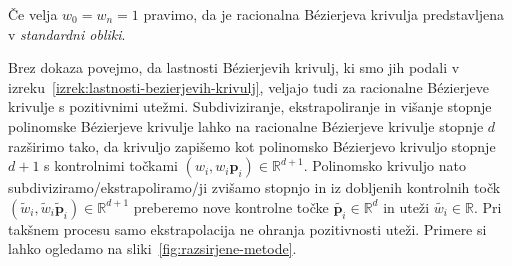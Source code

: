 \documentclass[isrm2, tisk]{fmfdelo}
\newcommand{\R}{\mathbb R}
\newcommand{\p}{\mathbf{p}}
\begin{document}
    \begin{opomba}
        Če velja $w_0=w_n=1$ pravimo, da je racionalna Bézierjeva krivulja predstavljena v \textit{standardni obliki}.
    \end{opomba}
    Brez dokaza povejmo, da lastnosti Bézierjevih krivulj, ki smo jih podali v izreku~\ref{izrek:lastnosti-bezierjevih-krivulj}, veljajo tudi za racionalne Bézierjeve krivulje s pozitivnimi utežmi.
    Subdiviziranje, ekstrapoliranje in višanje stopnje polinomske Bézierjeve krivulje lahko na racionalne Bézierjeve krivulje stopnje $d$ razširimo tako, da krivuljo zapišemo kot polinomsko Bézierjevo krivuljo stopnje $d+1$ s kontrolnimi točkami  $(w_i,w_{i}\p_i)\in \R^{d+1}$.
    Polinomsko krivuljo nato subdiviziramo/ekstrapoliramo/ji zvišamo stopnjo in iz dobljenih kontrolnih točk $(\tilde{w}_i,\tilde{w}_{i}\tilde{\p}_i)\in\R^{d+1}$ preberemo nove kontrolne točke $\tilde{\p_i}\in\R^d$ in uteži $\tilde{w_i}\in\R$.
    Pri takšnem procesu samo ekstrapolacija ne ohranja pozitivnosti uteži.
    Primere si lahko ogledamo na sliki~\ref{fig:razsirjene-metode}.
\end{document}
